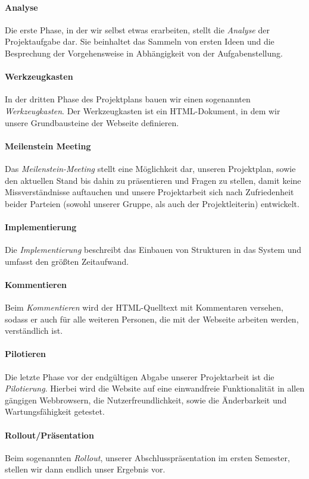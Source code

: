 \documentclass[12pt,a4paper]{article}
\begin{document}
\paragraph{Analyse}
Die erste Phase, in der wir selbst etwas erarbeiten, stellt die \textit{Analyse} der Projektaufgabe dar. Sie beinhaltet das Sammeln von ersten Ideen und  die Besprechung der Vorgehensweise in Abhängigkeit von der Aufgabenstellung.
\paragraph{Werkzeugkasten}
In der dritten Phase des Projektplans bauen wir einen sogenannten \textit{Werkzeugkasten}. Der Werkzeugkasten ist ein HTML-Dokument, in dem wir unsere Grundbausteine der Webseite definieren.
\paragraph{Meilenstein Meeting}
Das \textit{Meilenstein-Meeting} stellt eine Möglichkeit dar, unseren Projektplan, sowie den aktuellen Stand bis dahin zu präsentieren und Fragen zu stellen, damit keine Missverständnisse auftauchen und unsere Projektarbeit sich nach Zufriedenheit beider Parteien (sowohl unserer Gruppe, als auch der Projektleiterin) entwickelt.
\paragraph{Implementierung}
Die \textit{Implementierung} beschreibt das Einbauen von Strukturen in das System und umfasst den größten Zeitaufwand.
\paragraph{Kommentieren}
Beim \textit{Kommentieren} wird der HTML-Quelltext mit Kommentaren versehen, sodass er auch für alle weiteren Personen, die mit der Webseite arbeiten werden, verständlich ist.
\paragraph{Pilotieren}
Die letzte Phase vor der endgültigen Abgabe unserer Projektarbeit ist die \textit{Pilotierung}. Hierbei wird die Website auf eine einwandfreie Funktionalität in allen gängigen Webbrowsern,  die Nutzerfreundlichkeit, sowie die Änderbarkeit und Wartungsfähigkeit getestet.
\paragraph{Rollout/Präsentation}
Beim sogenannten \textit{Rollout}, unserer Abschlusspräsentation im ersten Semester, stellen wir dann endlich unser Ergebnis vor.
\end{document}
